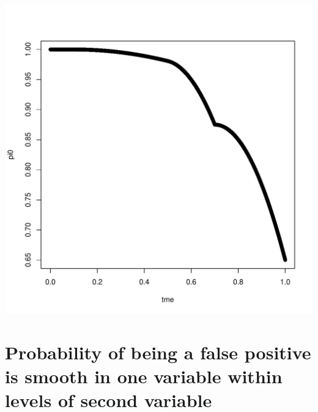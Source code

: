 \documentclass{article}\usepackage[]{graphicx}\usepackage[]{color}
\makeatletter
\def\maxwidth{ %
  \ifdim\Gin@nat@width>\linewidth
    \linewidth
  \else
    \Gin@nat@width
  \fi
}
\newenvironment{knitrout}{}{} %
\makeatother
\begin{document}
\begin{knitrout}
{\centering \includegraphics[width=\maxwidth]{Figures/II-1} 

}



\end{knitrout}

\section{Probability of being a false positive is smooth in one variable within levels of second variable}
\end{document}
